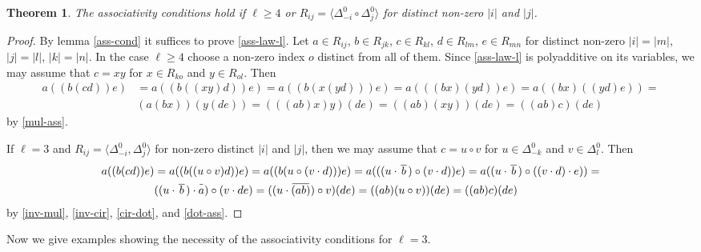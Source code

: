 \documentclass{article}
\newtheorem{theorem}{Theorem}
\theoremstyle{definition}
\newcommand{\inv}[1]{
    \!\;\overline{
        \!\!\:#1\vphantom !\!\!\:
    }\;\!
}
\begin{document}
\begin{theorem} \label{ass-forced}
    The associativity conditions hold if \(\ell \geq 4\) or \(
        R_{ij} = \langle
            \Delta^0_{-i} \circ \Delta^0_j
        \rangle
    \) for distinct non-zero \(|i|\) and \(|j|\).
\end{theorem}
\begin{proof}
    By lemma \ref{ass-cond} it suffices to prove \ref{ass-law-l}. Let \(a \in R_{ij}\), \(b \in R_{jk}\), \(c \in R_{kl}\), \(d \in R_{lm}\), \(e \in R_{mn}\) for distinct non-zero \(|i| = |m|\), \(|j| = |l|\), \(|k| = |n|\). In the case \(\ell \geq 4\) choose a non-zero index \(o\) distinct from all of them. Since \ref{ass-law-l} is polyadditive on its variables, we may assume that \(c = xy\) for \(x \in R_{ko}\) and \(y \in R_{ol}\). Then \begin{align*}
        a((b(cd))e)
        &=
        a((b((xy)d))e)
        =
        a((b(x(yd)))e)
        =
        a(((bx)(yd))e)
        =
        a((bx)((yd)e))
        =\\
        &(a(bx))(y(de))
        =
        (((ab)x)y)(de)
        =
        ((ab)(xy))(de)
        =
        ((ab)c)(de)
    \end{align*} by \ref{mul-ass}.

    If \(\ell = 3\) and \(R_{ij} = \langle \Delta^0_{-i}, \Delta^0_j \rangle\) for non-zero distinct \(|i|\) and \(|j|\), then we may assume that \(c = u \circ v\) for \(u \in \Delta^0_{-k}\) and \(v \in \Delta^0_l\). Then \begin{align*}
        a((b(cd))e)
        &=
        a((b((u \circ v)d))e)
        =
        a((b(u \circ (v \cdot d)))e)
        =
        a(((u \cdot \inv{\,b\,}) \circ (v \cdot d))e)
        =
        a((u \cdot \inv{\,b\,})
            \circ ((v \cdot d) \cdot e))
        =\\
        &((u \cdot \inv{\,b\,}) \cdot \inv a)
            \circ (v \cdot de)
        =
        ((u \cdot \inv{(ab)}) \circ v)(de)
        =
        ((ab)(u \circ v))(de)
        =
        ((ab)c)(de)
    \end{align*} by \ref{inv-mul}, \ref{inv-cir}, \ref{cir-dot}, and \ref{dot-ass}.
\end{proof}

Now we give examples showing the necessity of the associativity conditions for \(\ell = 3\).
\end{document}
